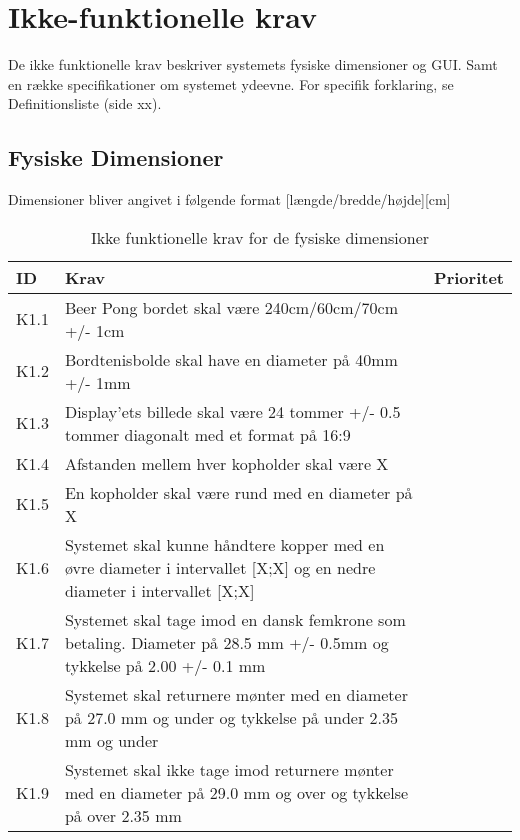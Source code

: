 \documentclass[Kravspecifikation/Kravspec_Main.tex]{subfiles}
\begin{document}
\section{Ikke-funktionelle krav}
De ikke funktionelle krav beskriver systemets fysiske dimensioner og GUI. Samt en række specifikationer om systemet ydeevne. For specifik forklaring, se Definitionsliste (side xx).

\subsection{Fysiske Dimensioner}
Dimensioner bliver angivet i følgende format [længde/bredde/højde][cm]
\begin{table}[H]
\begin{tabular}{|L{0.1\textwidth}|L{0.75\textwidth}|L{0.15\textwidth}|}
\hline
\textbf{ID} & \textbf{Krav} & \textbf{Prioritet} \\ \hline
K1.1 & Beer Pong bordet skal være 240cm/60cm/70cm +/- 1cm  &  \\ \hline
K1.2 & Bordtenisbolde skal have en diameter på 40mm +/- 1mm&  \\ \hline
K1.3 & Display'ets billede skal være 24 tommer +/- 0.5 tommer diagonalt med et format på 16:9&  \\ \hline
K1.4 & Afstanden mellem hver kopholder skal være X & \\ \hline
K1.5 & En kopholder skal være rund med en diameter på X & \\ \hline 
K1.6 & Systemet skal kunne håndtere kopper med en øvre diameter i intervallet [X;X] og en nedre diameter i intervallet [X;X] & \\ \hline
K1.7 & Systemet skal tage imod en dansk femkrone som betaling. Diameter på 28.5 mm +/- 0.5mm og tykkelse på 2.00 +/- 0.1 mm & \\ \hline
K1.8 & Systemet skal returnere mønter med en diameter på 27.0 mm og under og tykkelse på under 2.35 mm og under & \\ \hline
K1.9 & Systemet skal ikke tage imod returnere mønter med en diameter på 29.0 mm og over og tykkelse på over 2.35 mm& \\ \hline
\end{tabular}
\caption{Ikke funktionelle krav for de fysiske dimensioner}
\label{tab:fysiske_dimensioner}
\end{table}
\end{document}
